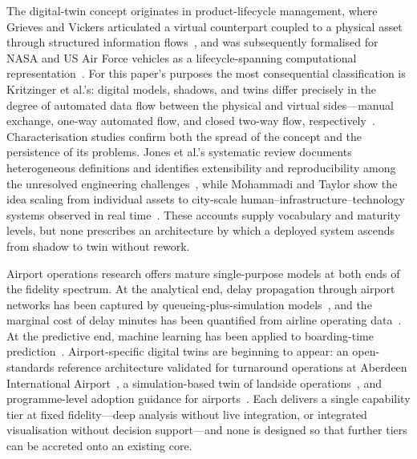 \documentclass[runningheads]{llncs}
\begin{document}
The digital-twin concept originates in product-lifecycle management, where Grieves and Vickers articulated a virtual counterpart coupled to a physical asset through structured information flows~\cite{grieves2017}, and was subsequently formalised for NASA and US Air Force vehicles as a lifecycle-spanning computational representation~\cite{glaessgen2012}. For this paper's purposes the most consequential classification is Kritzinger et al.'s: digital models, shadows, and twins differ precisely in the degree of automated data flow between the physical and virtual sides---manual exchange, one-way automated flow, and closed two-way flow, respectively~\cite{kritzinger2018}. Characterisation studies confirm both the spread of the concept and the persistence of its problems. Jones et al.'s systematic review documents heterogeneous definitions and identifies extensibility and reproducibility among the unresolved engineering challenges~\cite{jones2020}, while Mohammadi and Taylor show the idea scaling from individual assets to city-scale human--infrastructure--technology systems observed in real time~\cite{mohammadi2017}. These accounts supply vocabulary and maturity levels, but none prescribes an architecture by which a deployed system ascends from shadow to twin without rework.

Airport operations research offers mature single-purpose models at both ends of the fidelity spectrum. At the analytical end, delay propagation through airport networks has been captured by queueing-plus-simulation models~\cite{pyrgiotis2013}, and the marginal cost of delay minutes has been quantified from airline operating data~\cite{cook2009}. At the predictive end, machine learning has been applied to boarding-time prediction~\cite{schultz2019}. Airport-specific digital twins are beginning to appear: an open-standards reference architecture validated for turnaround operations at Aberdeen International Airport~\cite{conde2022}, a simulation-based twin of landside operations~\cite{palasca2025}, and programme-level adoption guidance for airports~\cite{acrp2024}. Each delivers a single capability tier at fixed fidelity---deep analysis without live integration, or integrated visualisation without decision support---and none is designed so that further tiers can be accreted onto an existing core.
\end{document}
